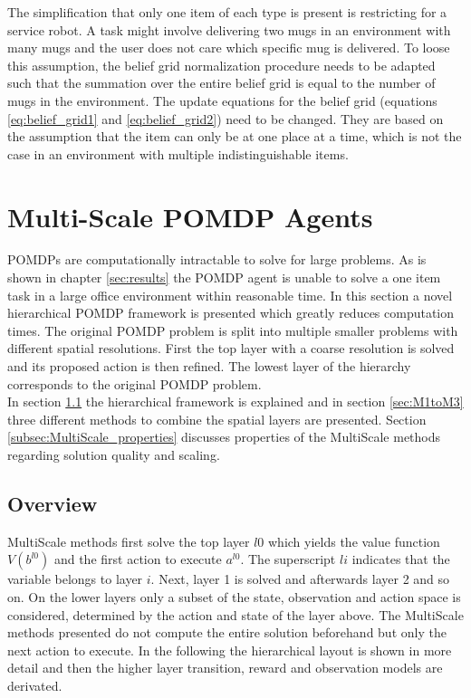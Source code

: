The simplification that only one item of each type is present is restricting for a service robot. A task might involve delivering two mugs in an environment with many mugs and the user does not care which specific mug is delivered. To loose this assumption, the belief grid normalization procedure needs to be adapted such that the summation over the entire belief grid is equal to the number of mugs in the environment. The update equations for the belief grid (equations \ref{eq:belief_grid1} and \ref{eq:belief_grid2}) need to be changed. They are based on the assumption that the item can only be at one place at a time, which is not the case in an environment with multiple indistinguishable items.
 
\section{Multi-Scale POMDP Agents}\label{sec:MultiScale}
POMDPs are computationally intractable to solve for large problems. As is shown in chapter \ref{sec:results} the POMDP agent is unable to solve a one item task in a large office environment within reasonable time. In this section a novel hierarchical POMDP framework is presented which greatly reduces computation times. The original POMDP problem is split into multiple smaller problems with different spatial resolutions. First the top layer with a coarse resolution is solved and its proposed action is then refined. The lowest layer of the hierarchy corresponds to the original POMDP problem.\\
In section \ref{subsec:MultiScale_overview} the hierarchical framework is explained and in section \ref{sec:M1toM3} three different methods to combine the spatial layers are presented. Section \ref{subsec:MultiScale_properties} discusses properties of the MultiScale methods regarding solution quality and scaling. 

\subsection{Overview} \label{subsec:MultiScale_overview}
MultiScale methods first solve the top layer $l0$ which yields the value function $V(b^{l0})$ and the first action to execute $a^{l0}$. The superscript $li$ indicates that the variable belongs to layer $i$. Next, layer 1 is solved and afterwards layer 2 and so on. On the lower layers only a subset of the state, observation and action space is considered, determined by the action and state of the layer above. The MultiScale methods presented do not compute the entire solution beforehand but only the next action to execute. In the following the hierarchical layout is shown in more detail and then the higher layer transition, reward and observation models are derivated.


